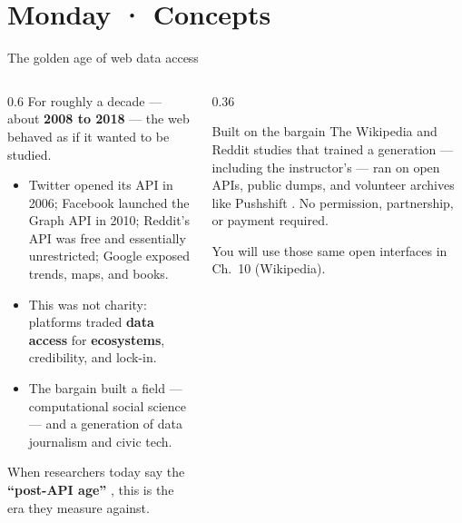 \documentclass[9pt,aspectratio=169]{beamer}
\begin{document}
\section{Monday · Concepts}

\begin{frame}{The golden age of web data access}
    \begin{columns}[T]
        \begin{column}{0.6\textwidth}
            For roughly a decade --- about \textbf{2008 to 2018} --- the web behaved as if it wanted to be studied.
            \begin{itemize}\small
                \item Twitter opened its API in 2006; Facebook launched the Graph API in 2010; Reddit's API was free and essentially unrestricted; Google exposed trends, maps, and books.
                \item This was not charity: platforms traded \textbf{data access} for \textbf{ecosystems}, credibility, and lock-in.
                \item The bargain built a field --- computational social science \parencite{lazer2009computational} --- and a generation of data journalism and civic tech.
            \end{itemize}

            \vspace{0.5em}

            When researchers today say the \textbf{``post-API age''} \parencite{freelon2018computational}, this is the era they measure against.
        \end{column}
        \begin{column}{0.36\textwidth}
            \begin{block}{Built on the bargain}
                \footnotesize The Wikipedia and Reddit studies that trained a generation --- including the instructor's --- ran on open APIs, public dumps, and volunteer archives like Pushshift \parencite{baumgartner2020pushshift}. No permission, partnership, or payment required.
            \end{block}
            {\scriptsize You will use those same open interfaces in Ch.~10 (Wikipedia).}
        \end{column}
    \end{columns}
\end{frame}
\end{document}
